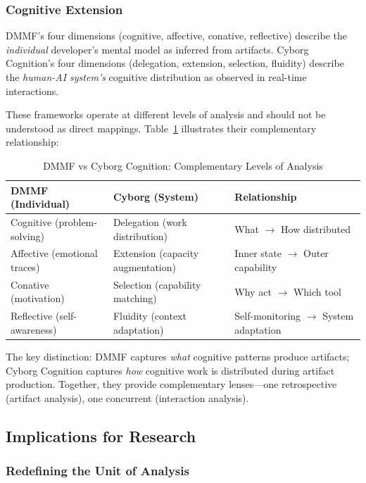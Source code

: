 \subsubsection{Cognitive Extension}

DMMF's four dimensions (cognitive, affective, conative, reflective) describe the \textit{individual} developer's mental model as inferred from artifacts. Cyborg Cognition's four dimensions (delegation, extension, selection, fluidity) describe the \textit{human-AI system's} cognitive distribution as observed in real-time interactions.

These frameworks operate at different levels of analysis and should not be understood as direct mappings. Table~\ref{tab:frameworks} illustrates their complementary relationship:

\begin{table}[h]
\caption{DMMF vs Cyborg Cognition: Complementary Levels of Analysis}
\label{tab:frameworks}
\centering
\begin{tabular}{lll}
\toprule
\textbf{DMMF (Individual)} & \textbf{Cyborg (System)} & \textbf{Relationship} \\
\midrule
Cognitive (problem-solving) & Delegation (work distribution) & What $\rightarrow$ How distributed \\
Affective (emotional traces) & Extension (capacity augmentation) & Inner state $\rightarrow$ Outer capability \\
Conative (motivation) & Selection (capability matching) & Why act $\rightarrow$ Which tool \\
Reflective (self-awareness) & Fluidity (context adaptation) & Self-monitoring $\rightarrow$ System adaptation \\
\bottomrule
\end{tabular}
\end{table}

The key distinction: DMMF captures \textit{what} cognitive patterns produce artifacts; Cyborg Cognition captures \textit{how} cognitive work is distributed during artifact production. Together, they provide complementary lenses---one retrospective (artifact analysis), one concurrent (interaction analysis).

\subsection{Implications for Research}

\subsubsection{Redefining the Unit of Analysis}

